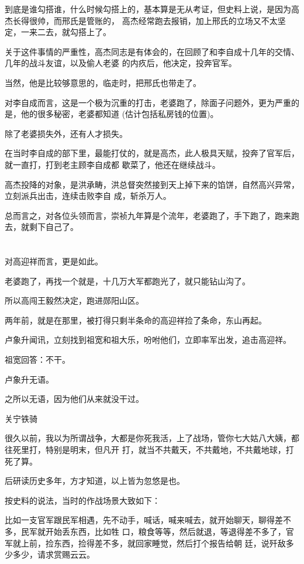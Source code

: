 \documentclass[11pt,a4paper,onecolumn]{article}
\begin{document}
到底是谁勾搭谁，什么时候勾搭上的，基本算是无从考证，但史料上说，是因为高杰长得很帅，而邢氏是管账的，
高杰经常跑去报销，加上邢氏的立场又不太坚定，一来二去，就勾搭上了。

关于这件事情的严重性，高杰同志是有体会的，在回顾了和李自成十几年的交情、几年的战斗友谊，以及偷人老婆
的内疚后，他决定，投奔官军。

当然，他是比较够意思的，临走时，把邢氏也带走了。

对李自成而言，这是一个极为沉重的打击，老婆跑了，除面子问题外，更为严重的是，他的很多秘密，老婆都知道
(估计包括私房钱的位置)。

除了老婆损失外，还有人才损失。

在当时李自成的部下里，最能打仗的，就是高杰，此人极具天赋，投奔了官军后，就一直打，打到老主顾李自成都
歇菜了，他还在继续战斗。

高杰投降的对象，是洪承畴，洪总督突然接到天上掉下来的馅饼，自然高兴异常，立刻派兵出击，连续击败李自
成，斩杀万人。

总而言之，对各位头领而言，崇祯九年算是个流年，老婆跑了，手下跑了，跑来跑去，就剩下自己了。

\section[\thesection]{}

对高迎祥而言，更是如此。

老婆跑了，再找一个就是，十几万大军都跑光了，就只能钻山沟了。

所以高闯王毅然决定，跑进郧阳山区。

两年前，就是在那里，被打得只剩半条命的高迎祥捡了条命，东山再起。

卢象升闻讯，立刻找到祖宽和祖大乐，吩咐他们，立即率军出发，追击高迎祥。

祖宽回答：不干。

卢象升无语。

之所以无语，因为他们从来就没干过。

关宁铁骑

很久以前，我以为所谓战争，大都是你死我活，上了战场，管你七大姑八大姨，都往死里打，特别是明末，但凡开
打，就当不共戴天，不共戴地，不共戴地球，打死了算。

后研读历史多年，方才知道，以上皆为忽悠是也。

按史料的说法，当时的作战场景大致如下：

比如一支官军跟民军相遇，先不动手，喊话，喊来喊去，就开始聊天，聊得差不多，民军就开始丢东西，比如牲
口，粮食等等，然后就退，等退得差不多了，官军就上前，捡东西，捡得差不多，就回家睡觉，然后打个报告给朝
廷，说歼敌多少多少，请求赏赐云云。
\end{document}
